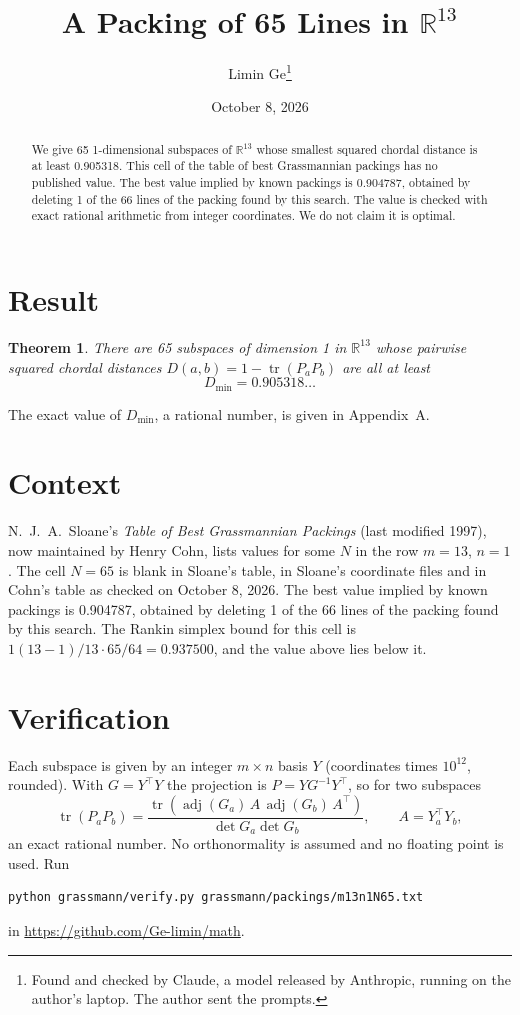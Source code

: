 \documentclass[11pt,a4paper]{article}
\title{A Packing of 65 Lines in $\mathbb{R}^{13}$}
\author{Limin Ge\thanks{Found and checked by Claude, a model released by Anthropic, running on the author's laptop. The author sent the prompts.}}
\date{October 8, 2026}
\newtheorem*{theorem}{Theorem}
\begin{document}
\maketitle
\begin{abstract}
We give 65 1-dimensional subspaces of $\mathbb{R}^{13}$ whose smallest squared chordal distance is at least 0.905318. This cell of the table of best Grassmannian packings has no published value. The best value implied by known packings is 0.904787, obtained by deleting 1 of the 66 lines of the packing found by this search. The value is checked with exact rational arithmetic from integer coordinates. We do not claim it is optimal.
\end{abstract}

\section{Result}
\begin{theorem}
There are 65 subspaces of dimension 1 in $\mathbb{R}^{13}$ whose pairwise squared chordal distances $D(a,b) = 1 - \operatorname{tr}(P_aP_b)$ are all at least
\[ D_{\min} = 0.905318\ldots \]
\end{theorem}
The exact value of $D_{\min}$, a rational number, is given in Appendix~A.


\section{Context}
N.~J.~A.~Sloane's \emph{Table of Best Grassmannian Packings} (last modified 1997), now maintained by Henry Cohn, lists values for some $N$ in the row $m=13$, $n=1$. The cell $N=65$ is blank in Sloane's table, in Sloane's coordinate files and in Cohn's table as checked on October 8, 2026. The best value implied by known packings is 0.904787, obtained by deleting 1 of the 66 lines of the packing found by this search. The Rankin simplex bound for this cell is $1(13-1)/13\cdot 65/64 = 0.937500$, and the value above lies below it.


\section{Verification}
Each subspace is given by an integer $m\times n$ basis $Y$ (coordinates times $10^{12}$, rounded). With $G=Y^\top Y$ the projection is $P=YG^{-1}Y^\top$, so for two subspaces
\[ \operatorname{tr}(P_aP_b)=\frac{\operatorname{tr}(\operatorname{adj}(G_a)\,A\,\operatorname{adj}(G_b)\,A^\top)}{\det G_a\det G_b},\qquad A=Y_a^\top Y_b, \]
an exact rational number. No orthonormality is assumed and no floating point is used. Run
\begin{verbatim}
python grassmann/verify.py grassmann/packings/m13n1N65.txt
\end{verbatim}
in \url{https://github.com/Ge-limin/math}.
\end{document}
